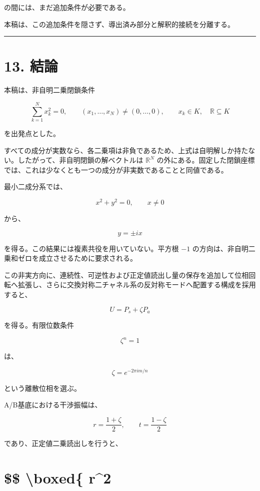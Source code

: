 \documentclass[
  a4paper,
  10pt]{article}
\begin{document}
の間には、まだ追加条件が必要である。

本稿は、この追加条件を隠さず、導出済み部分と解釈的接続を分離する。

\begin{center}\rule{0.5\linewidth}{0.5pt}\end{center}

\section{13. 結論}\label{13-ux7d50ux8ad6}

本稿は、非自明二乗閉鎖条件

\[
\boxed{
\sum_{k=1}^{N}x_k^2=0,
\qquad
(x_1,\ldots,x_N)\neq(0,\ldots,0),
\qquad
x_k\in K,
\quad
\mathbb R\subseteq K
}
\]

を出発点とした。

すべての成分が実数なら、各二乗項は非負であるため、上式は自明解しか持たない。したがって、非自明閉鎖の解ベクトルは
\(\mathbb R^N\)
の外にある。固定した閉鎖座標では、これは少なくとも一つの成分が非実数であることと同値である。

最小二成分系では、

\[
x^2+y^2=0,
\qquad x\neq0
\]

から、

\[
\boxed{
y=\pm ix
}
\]

を得る。この結果には複素共役を用いていない。平方根 \(-1\)
の方向は、非自明二乗和ゼロを成立させるために要求される。

この非実方向に、連続性、可逆性および正定値読出し量の保存を追加して位相回転へ拡張し、さらに交換対称二チャネル系の反対称モードへ配置する構成を採用すると、

\[
U=P_s+\zeta P_a
\]

を得る。有限位数条件

\[
\zeta^n=1
\]

は、

\[
\zeta=e^{-2\pi im/n}
\]

という離散位相を選ぶ。

A/B基底における干渉振幅は、

\[
r=\frac{1+\zeta}{2},
\qquad
t=\frac{1-\zeta}{2}
\]

であり、正定値二乗読出しを行うと、

\section{\$\$ \textbackslash boxed\{
\textbar r\textbar\^{}2}\label{-boxed-r2}
\end{document}
